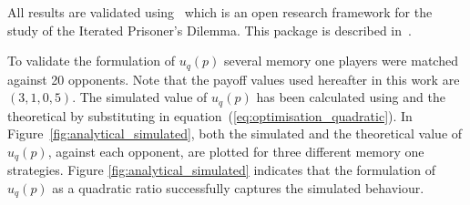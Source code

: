 \documentclass[10pt]{article}
\begin{document}
All results are validated using~\cite{axelrodproject} which is an open research
framework for the study of the Iterated Prisoner's Dilemma. This package is
described in~\cite{Knight2016}.

To validate the formulation of \(u_q(p)\) several memory one players were 
matched against 20 opponents. Note that the payoff values  used hereafter in this
work are \((3, 1, 0, 5)\). 
The simulated value of \(u_q(p)\) has been calculated using \cite{axelrodproject}
and the theoretical by  substituting in equation~(\ref{eq:optimisation_quadratic}).
In Figure~\ref{fig:analytical_simulated}, both the simulated and the theoretical
value of \(u_q(p)\), against each opponent, are plotted for three different memory
one strategies. Figure \ref{fig:analytical_simulated} indicates that the 
formulation of \(u_q(p)\) as a quadratic ratio successfully captures the 
simulated behaviour.
\end{document}
